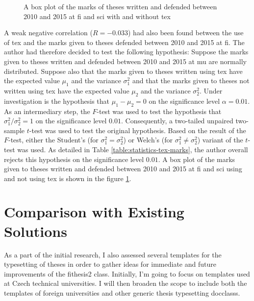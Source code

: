 \begin{figure}
    \caption{A box plot of the marks of theses written and defended between 2010 and 2015 at \acrshort{fi} and \acrshort{sci} with and without \gls{tex}}
    \label{fig:statistics-marks}
  \end{figure}

  A weak negative correlation ($R=-0.033$) had also been found between the use of \gls{tex} and the marks given to theses defended between 2010 and 2015 at \gls{fi}. The author had therefore decided to test the following \gls{hypothesis}: Suppose the marks given to theses written and defended between 2010 and 2015 at \gls{mu} are normally distributed. Suppose also that the marks given to theses written using \gls{tex} have the expected value $\mu_1$ and the variance $\sigma_1^2$ and that the marks given to theses not written using \gls{tex} have the expected value $\mu_2$ and the variance $\sigma_2^2$. Under investigation is the \gls{hypothesis} that $\mu_1-\mu_2=0$ on the significance level $\alpha=0.01$. As an intermediary step, the $F$-test was used to test the \gls{hypothesis} that $\sigma_1^2/\sigma_2^2=1$ on the significance level $0.01$. Consequently, a two-tailed unpaired two-sample $t$-test was used to test the original \gls{hypothesis}. Based on the result of the $F$-test, either the Student's (for $\sigma_1^2=\sigma_2^2$) or Welch's (for $\sigma_1^2\not=\sigma_2^2$) variant of the $t$-test was used. As detailed in Table \ref{table:statistics-tex-marks}, the author overall rejects this \gls{hypothesis} on the significance level $0.01$. A box plot of the marks given to theses written and defended between 2010 and 2015 at \gls{fi} and \gls{sci} using and not using \gls{tex} is shown in the figure \ref{fig:statistics-marks}.

  \section{Comparison with Existing Solutions}
  As a part of the initial research, I also assessed several templates for the typesetting of theses in order to gather ideas for immediate and future improvements of the fithesis2 class. Initially, I'm going to focus on templates used at Czech technical universities. I will then broaden the scope to include both the templates of foreign universities and other generic thesis typesetting \glspl{docclass}.

